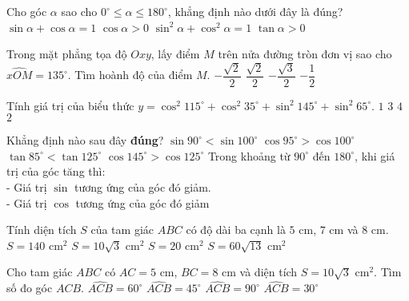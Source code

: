 \begin{ex}
	Cho góc $\alpha$ sao cho $0^\circ\leq\alpha\leq 180^\circ$, khẳng định nào dưới đây là đúng?
	\choice
	{$\sin\alpha+\cos\alpha=1$}
	{$\cos\alpha>0$}	
	{\True $\sin^2\alpha+\cos^2\alpha=1$}
	{$\tan\alpha>0$} 
\end{ex}
\begin{ex}
	Trong mặt phẳng tọa độ $Oxy$, lấy điểm $M$ trên nửa đường tròn đơn vị sao cho $\widehat{xOM}=135^\circ$. Tìm hoành độ của điểm $M$.
	\choice
	{\True $-\dfrac{\sqrt{2}}{2}$}
	{$\dfrac{\sqrt{2}}{2}$}
	{$-\dfrac{\sqrt{3}}{2}$}
	{$-\dfrac{1}{2}$}
\end{ex}
\begin{ex}
	Tính giá trị của biểu thức $y=\cos^2 115^\circ+\cos^2 35^\circ+\sin^2 145^\circ +\sin^2 65^\circ$.
	\choice
	{$1$}
	{$3$}
	{$4$}
	{\True $2$}
\end{ex}
\begin{ex}
	Khẳng định nào sau đây \textbf{đúng}?
	\choice
	{$\sin 90^\circ <\sin 100^\circ $}
	{\True $\cos 95^\circ >\cos 100^\circ $}
	{$\tan 85^\circ <\tan 125^\circ $}
	{$\cos 145^\circ >\cos 125^\circ $}
	\loigiai
	{Trong khoảng từ $90^\circ $ đến $180^\circ $, khi giá trị của góc tăng thì:\\
		- Giá trị $\sin$ tương ứng của góc đó giảm.\\
		- Giá trị $\cos$ tương ứng của góc đó giảm}
\end{ex}
\begin{ex}
	Tính diện tích $S$ của tam giác $ABC$ có độ dài ba cạnh là $5$ cm, $7$ cm và $8$ cm.
	\choice
	{$S=140$ cm$^2$}
	{\True $S=10\sqrt{3}$ cm$^2$}
	{$S=20$ cm$^2$}
	{$S=60\sqrt{13}$ cm$^2$}
\end{ex}
\begin{ex}
	Cho tam giác $ABC$ có $AC=5$ cm, $BC=8$ cm và diện tích $S=10\sqrt{3}$ cm$^2$. Tìm số đo góc $ACB$.
	\choice
	{\True $\widehat{ACB}=60^{\circ}$}
	{$\widehat{ACB}=45^{\circ}$}
	{$\widehat{ACB}=90^{\circ}$}
	{$\widehat{ACB}=30^{\circ}$}
\end{ex}

